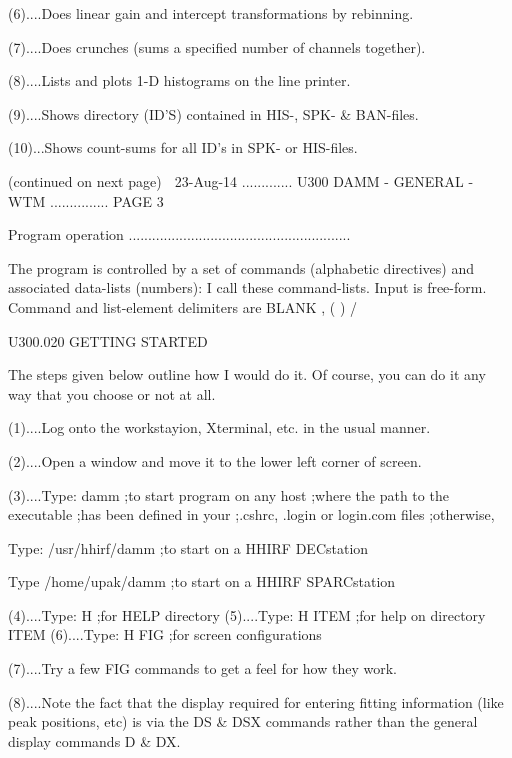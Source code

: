    (6)....Does linear gain and intercept transformations by rebinning.
 
   (7)....Does crunches (sums a specified number of channels together).
 
   (8)....Lists and plots 1-D histograms on the line printer.
 
   (9)....Shows directory (ID'S) contained in HIS-, SPK- & BAN-files.
 
   (10)...Shows count-sums for all ID's in SPK- or HIS-files.
 
 
                            (continued on next page)
    
   23-Aug-14 ............. U300  DAMM - GENERAL - WTM ............... PAGE   3
 
   Program operation .........................................................
 
   The program is controlled by a set of commands (alphabetic directives)  and
   associated  data-lists  (numbers):  I  call  these  command-lists. Input is
   free-form. Command and list-element delimiters are BLANK , ( ) /
 
   U300.020  GETTING STARTED
 
   The steps given below outline how I would do it. Of course, you can  do  it
   any way that you choose or not at all.
 
   (1)....Log onto the workstayion, Xterminal, etc. in the usual manner.
 
   (2)....Open a window and move it to the lower left corner of screen.
 
 
   (3)....Type:  damm                ;to start program on any host
                                     ;where the path to the executable
                                     ;has been defined in your
                                     ;.cshrc, .login or login.com files
                                     ;otherwise,
 
          Type:  /usr/hhirf/damm     ;to start on a HHIRF DECstation
 
          Type   /home/upak/damm     ;to start on a HHIRF SPARCstation
 
   (4)....Type:  H                   ;for HELP directory
   (5)....Type:  H  ITEM             ;for help on directory ITEM
   (6)....Type:  H  FIG              ;for screen configurations
 
   (7)....Try a few FIG commands to get a feel for how they work.
 
   (8)....Note  the  fact  that  the  display  required  for  entering fitting
          information (like peak positions, etc) is via the DS & DSX  commands
          rather than the general display commands D & DX.
 

